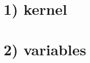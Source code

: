 \hypertarget{opencl_opencl_kernel}{}\section{1) kernel}\label{opencl_opencl_kernel}
\hypertarget{opencl_opencl_variables}{}\section{2) variables}\label{opencl_opencl_variables}

